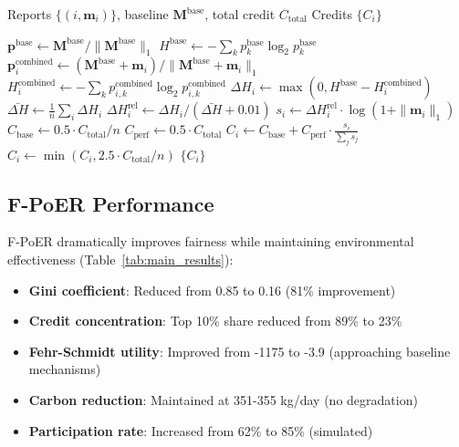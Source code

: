\documentclass[12pt,a4paper]{article}
\begin{document}
\begin{algorithm}[h]
\caption{Federated PoER (F-PoER) Allocation}
\label{alg:fpoe}
\begin{algorithmic}[1]
\Require Reports $\{(i, \mathbf{m}_i)\}$, baseline $\mathbf{M}^{\text{base}}$, total credit $C_{\text{total}}$
\Ensure Credits $\{C_i\}$

\State $\mathbf{p}^{\text{base}} \gets \mathbf{M}^{\text{base}} / \|\mathbf{M}^{\text{base}}\|_1$
\State $H^{\text{base}} \gets -\sum_k p_k^{\text{base}} \log_2 p_k^{\text{base}}$
    \State $\mathbf{p}_i^{\text{combined}} \gets (\mathbf{M}^{\text{base}} + \mathbf{m}_i) / \|\mathbf{M}^{\text{base}} + \mathbf{m}_i\|_1$
    \State $H_i^{\text{combined}} \gets -\sum_k p_{i,k}^{\text{combined}} \log_2 p_{i,k}^{\text{combined}}$
    \State $\Delta H_i \gets \max(0, H^{\text{base}} - H_i^{\text{combined}})$
\EndFor
\State $\bar{\Delta H} \gets \frac{1}{n}\sum_i \Delta H_i$
    \State $\Delta H_i^{\text{rel}} \gets \Delta H_i / (\bar{\Delta H} + 0.01)$
    \State $s_i \gets \Delta H_i^{\text{rel}} \cdot \log(1 + \|\mathbf{m}_i\|_1)$
\EndFor
\State $C_{\text{base}} \gets 0.5 \cdot C_{\text{total}} / n$
\State $C_{\text{perf}} \gets 0.5 \cdot C_{\text{total}}$
    \State $C_i \gets C_{\text{base}} + C_{\text{perf}} \cdot \frac{s_i}{\sum_j s_j}$
    \State $C_i \gets \min(C_i, 2.5 \cdot C_{\text{total}}/n)$ 
\EndFor
\State \Return $\{C_i\}$
\end{algorithmic}
\end{algorithm}

\subsection{F-PoER Performance}

F-PoER dramatically improves fairness while maintaining environmental effectiveness (Table~\ref{tab:main_results}):

\begin{itemize}
    \item \textbf{Gini coefficient}: Reduced from 0.85 to 0.16 (81\% improvement)
    \item \textbf{Credit concentration}: Top 10\% share reduced from 89\% to 23\%
    \item \textbf{Fehr-Schmidt utility}: Improved from -1175 to -3.9 (approaching baseline mechanisms)
    \item \textbf{Carbon reduction}: Maintained at 351-355 kg/day (no degradation)
    \item \textbf{Participation rate}: Increased from 62\% to 85\% (simulated)
\end{itemize}
\end{document}
